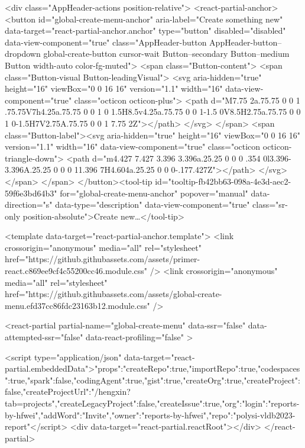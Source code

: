         <div class="AppHeader-actions position-relative">
             <react-partial-anchor>
      <button id="global-create-menu-anchor" aria-label="Create something new" data-target="react-partial-anchor.anchor" type="button" disabled="disabled" data-view-component="true" class="AppHeader-button AppHeader-button--dropdown global-create-button cursor-wait Button--secondary Button--medium Button width-auto color-fg-muted">  <span class="Button-content">
      <span class="Button-visual Button-leadingVisual">
        <svg aria-hidden="true" height="16" viewBox="0 0 16 16" version="1.1" width="16" data-view-component="true" class="octicon octicon-plus">
    <path d="M7.75 2a.75.75 0 0 1 .75.75V7h4.25a.75.75 0 0 1 0 1.5H8.5v4.25a.75.75 0 0 1-1.5 0V8.5H2.75a.75.75 0 0 1 0-1.5H7V2.75A.75.75 0 0 1 7.75 2Z"></path>
</svg>
      </span>
    <span class="Button-label"><svg aria-hidden="true" height="16" viewBox="0 0 16 16" version="1.1" width="16" data-view-component="true" class="octicon octicon-triangle-down">
    <path d="m4.427 7.427 3.396 3.396a.25.25 0 0 0 .354 0l3.396-3.396A.25.25 0 0 0 11.396 7H4.604a.25.25 0 0 0-.177.427Z"></path>
</svg></span>
  </span>
</button><tool-tip id="tooltip-fb42bb63-098a-4e3d-aec2-59f6e3bd64b3" for="global-create-menu-anchor" popover="manual" data-direction="s" data-type="description" data-view-component="true" class="sr-only position-absolute">Create new…</tool-tip>

      <template data-target="react-partial-anchor.template">
        <link crossorigin="anonymous" media="all" rel="stylesheet" href="https://github.githubassets.com/assets/primer-react.c869ee9cf4c55200cc46.module.css" />
<link crossorigin="anonymous" media="all" rel="stylesheet" href="https://github.githubassets.com/assets/global-create-menu.efd37cc86fdc23163b12.module.css" />

<react-partial
  partial-name="global-create-menu"
  data-ssr="false"
  data-attempted-ssr="false"
  data-react-profiling="false"
>
  
  <script type="application/json" data-target="react-partial.embeddedData">{"props":{"createRepo":true,"importRepo":true,"codespaces":true,"spark":false,"codingAgent":true,"gist":true,"createOrg":true,"createProject":false,"createProjectUrl":"/hengxin?tab=projects","createLegacyProject":false,"createIssue":true,"org":{"login":"reports-by-hfwei","addWord":"Invite"},"owner":"reports-by-hfwei","repo":"polysi-vldb2023-report"}}</script>
  <div data-target="react-partial.reactRoot"></div>
</react-partial>


